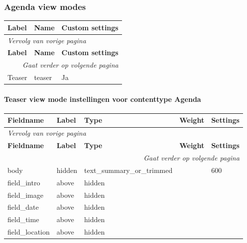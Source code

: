 \subsubsection{Agenda view modes}
  \begin{longtable}{| p{5.00cm}|p{5.00cm}|p{5.00cm}|}
  \hline
  \rowcolor{tableheader}
  \textbf{Label} & \textbf{Name} & \textbf{Custom settings}  \tabularnewline
  \hline
\endfirsthead
\multicolumn{3}{l}{\textit{Vervolg van vorige pagina}} \\
\hline
\rowcolor{tableheader}
  \textbf{Label} & \textbf{Name} & \textbf{Custom settings}  \tabularnewline
  \hline
\hline
\endhead
\multicolumn{3}{r}{\textit{Gaat verder op volgende pagina}} \\
\endfoot
\hline
\endlastfoot
  Teaser & teaser & Ja  \tabularnewline
  \hline
  \end{longtable}

\paragraph{Teaser view mode instellingen voor contenttype Agenda }

  \begin{longtable}{| p{3.00cm}|p{3.00cm}|p{3.00cm}|p{3.00cm}|p{3.00cm}|}
  \hline
  \rowcolor{tableheader}
  \textbf{Fieldname} & \textbf{Label} & \textbf{Type} & \textbf{Weight} & \textbf{Settings}  \tabularnewline
  \hline
\endfirsthead
\multicolumn{5}{l}{\textit{Vervolg van vorige pagina}} \\
\hline
\rowcolor{tableheader}
  \textbf{Fieldname} & \textbf{Label} & \textbf{Type} & \textbf{Weight} & \textbf{Settings}  \tabularnewline
  \hline
\hline
\endhead
\multicolumn{5}{r}{\textit{Gaat verder op volgende pagina}} \\
\endfoot
\hline
\endlastfoot
  body & hidden & text\_summary\_or\_trimmed &   & 600  \tabularnewline
  \hline
  field\_intro & above & hidden &   &    \tabularnewline
  \hline
  field\_image & above & hidden &   &    \tabularnewline
  \hline
  field\_date & above & hidden &   &    \tabularnewline
  \hline
  field\_time & above & hidden &   &    \tabularnewline
  \hline
  field\_location & above & hidden &   &    \tabularnewline
  \hline
  \end{longtable}


